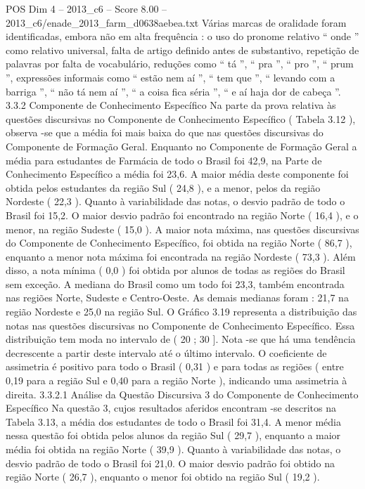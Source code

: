\begin{textsample}{POS Dim 4 – 2013\_c6 – Score 8.00 – 2013\_c6/enade\_2013\_farm\_d0638aebea.txt}
Várias marcas de oralidade foram identificadas, embora não em alta frequência : o uso do pronome relativo “ onde ” como relativo universal, falta de artigo definido antes de substantivo, repetição de palavras por falta de vocabulário, reduções como “ tá ”, “ pra ”, “ pro ”, “ prum ”, expressões informais como “ estão nem aí ”, “ tem que ”, “ levando com a barriga ”, “ não tá nem aí ”, “ a coisa fica séria ”, “ e aí haja dor de cabeça ”. 3.3.2 Componente de Conhecimento Específico Na parte da prova relativa às questões discursivas no Componente de Conhecimento Específico ( Tabela 3.12 ), observa -se que a média foi mais baixa do que nas questões discursivas do Componente de Formação Geral.
Enquanto no Componente de Formação Geral a média para estudantes de Farmácia de todo o Brasil foi 42,9, na Parte de Conhecimento Específico a média foi 23,6.
A maior média deste componente foi obtida pelos estudantes da região Sul ( 24,8 ), e a menor, pelos da região Nordeste ( 22,3 ).
Quanto à variabilidade das notas, o desvio padrão de todo o Brasil foi 15,2.
O maior desvio padrão foi encontrado na região Norte ( 16,4 ), e o menor, na região Sudeste ( 15,0 ).
A maior nota máxima, nas questões discursivas do Componente de Conhecimento Específico, foi obtida na região Norte ( 86,7 ), enquanto a menor nota máxima foi encontrada na região Nordeste ( 73,3 ).
Além disso, a nota mínima ( 0,0 ) foi obtida por alunos de todas as regiões do Brasil sem exceção.
A mediana do Brasil como um todo foi 23,3, também encontrada nas regiões Norte, Sudeste e Centro-Oeste.
As demais medianas foram : 21,7 na região Nordeste e 25,0 na região Sul.
O Gráfico 3.19 representa a distribuição das notas nas questões discursivas no Componente de Conhecimento Específico.
Essa distribuição tem moda no intervalo de ( 20 ; 30 ].
Nota -se que há uma tendência decrescente a partir deste intervalo até o último intervalo.
O coeficiente de assimetria é positivo para todo o Brasil ( 0,31 ) e para todas as regiões ( entre 0,19 para a região Sul e 0,40 para a região Norte ), indicando uma assimetria à direita. 3.3.2.1 Análise da Questão Discursiva 3 do Componente de Conhecimento Específico Na questão 3, cujos resultados aferidos encontram -se descritos na Tabela 3.13, a média dos estudantes de todo o Brasil foi 31,4.
A menor média nessa questão foi obtida pelos alunos da região Sul ( 29,7 ), enquanto a maior média foi obtida na região Norte ( 39,9 ).
Quanto à variabilidade das notas, o desvio padrão de todo o Brasil foi 21,0.
O maior desvio padrão foi obtido na região Norte ( 26,7 ), enquanto o menor foi obtido na região Sul ( 19,2 ).

\end{textsample}
